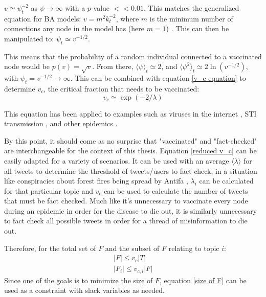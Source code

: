 \documentclass[preprint,review,12pt]{elsarticle}
\begin{document}
$v \simeq \psi_t^{-2}$ as $\psi \rightarrow \infty$ with a $p$-value $<< 0.01$. This matches the generalized equation for BA models: $v = m^2k_t^{-2}$, where $m$ is the minimum number of connections any node in the model has (here $m = 1$) \citep{pastor2001epidemic}. This can then be manipulated to: $\psi_t \simeq v^{-1/2}$. 

This means that the probability of a random individual connected to a vaccinated node would be $p(v) = \sqrt{v}$. From there, $\langle \psi \rangle_t \simeq 2$, and $\langle \psi^2 \rangle_t \simeq 2 \ln(v^{-1/2})$, with $\psi_t = v^{-1/2} \rightarrow \infty$. This can be combined with equation \ref{v_c equation} to determine $v_c$, the critical fraction that needs to be vaccinated:
\begin{equation}
\label{reduced v_c} 
    v_c \simeq \exp{(-2/\lambda)}
\end{equation}

This equation has  been applied to examples such as viruses in the internet \citep{kephart1993computers}, STI transmission \citep{anderson1992infectious,lloyd2001viruses}, and other epidemics \citep{diekmann2000mathematical}. 

By this point, it should come as no surprise that "vaccinated" and "fact-checked" are interchangeable for the context of this thesis. Equation \ref{reduced v_c} can be easily adapted for a variety of scenarios. It can be used with an average $\langle \lambda \rangle$ for all tweets to determine the threshold of tweets/users to fact-check; in a situation like conspiracies about forest fires being spread by Antifa \citep{robinson2020oregon}, $\lambda_i$ can be calculated for that particular topic and $v_c$ can be used to calculate the number of tweets that must be fact checked. Much like it's unnecessary to vaccinate every node during an epidemic in order for the disease to die out, it is similarly unnecessary to fact check all possible tweets in order for a thread of misinformation to die out.

Therefore, for the total set of $F$ and the subset of $F$ relating to topic $i$: 
\begin{equation}
    \label{size of F}
    \begin{split}
    |F| \leq v_{c}|T| \\
    |F_{i}| \leq v_{c,i}|F|
    \end{split}
\end{equation}
Since one of the goals is to minimize the size of $F$, equation \ref{size of F} can be used as a constraint with slack variables as needed.
\end{document}
